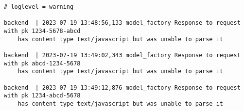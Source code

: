\begin{minipage}
    \begin{lstlisting}[caption={Console log of an interaction with a web application on log level warning. Other logging levels include warnings, errors, and critical system failures.}, label={suppresslogscode}]
# loglevel = warning

backend  | 2023-07-19 13:48:56,133 model_factory Response to request with pk 1234-5678-abcd 
    has content type text/javascript but was unable to parse it

backend  | 2023-07-19 13:49:02,343 model_factory Response to request with pk abcd-1234-5678 
    has content type text/javascript but was unable to parse it

backend  | 2023-07-19 13:49:12,876 model_factory Response to request with pk 1234-abcd-5678 
    has content type text/javascript but was unable to parse it
    \end{lstlisting}
\end{minipage}